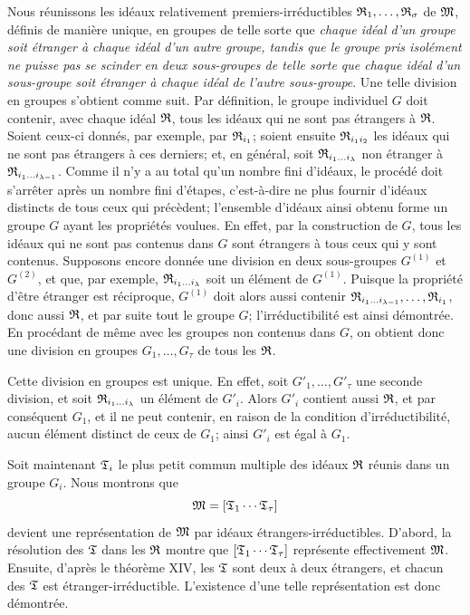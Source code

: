 Nous réunissons les idéaux relativement premiers-irréductibles $\mathfrak{R}_1,\ldots,\mathfrak{R}_\sigma$ de $\mathfrak{M}$, définis de manière unique, en groupes de telle sorte que \emph{chaque idéal d'un groupe soit étranger à chaque idéal d'un autre groupe, tandis que le groupe pris isolément ne puisse pas se scinder en deux sous-groupes de telle sorte que chaque idéal d'un sous-groupe soit étranger à chaque idéal de l'autre sous-groupe}. Une telle division en groupes s'obtient comme suit. Par définition, le groupe individuel $G$ doit contenir, avec chaque idéal $\mathfrak{R}$, tous les idéaux qui ne sont pas étrangers à $\mathfrak{R}$. Soient ceux-ci donnés, par exemple, par $\mathfrak{R}_{i_1}$; soient ensuite $\mathfrak{R}_{i_1i_2}$ les idéaux qui ne sont pas étrangers à ces derniers; et, en général, soit $\mathfrak{R}_{i_1\ldots i_\lambda}$ non étranger à $\mathfrak{R}_{i_1\ldots i_{\lambda-1}}$. Comme il n'y a au total qu'un nombre fini d'idéaux, le procédé doit s'arrêter après un nombre fini d'étapes, c'est-à-dire ne plus fournir d'idéaux distincts de tous ceux qui précèdent; l'ensemble d'idéaux ainsi obtenu forme un groupe $G$ ayant les propriétés voulues. En effet, par la construction de $G$, tous les idéaux qui ne sont pas contenus dans $G$ sont étrangers à tous ceux qui y sont contenus. Supposons encore donnée une division en deux sous-groupes $G^{(1)}$ et $G^{(2)}$, et que, par exemple, $\mathfrak{R}_{i_1\ldots i_\lambda}$ soit un élément de $G^{(1)}$. Puisque la propriété d'être étranger est réciproque, $G^{(1)}$ doit alors aussi contenir $\mathfrak{R}_{i_1\ldots i_{\lambda-1}},\ldots,\mathfrak{R}_{i_1}$, donc aussi $\mathfrak{R}$, et par suite tout le groupe $G$; l'irréductibilité est ainsi démontrée. En procédant de même avec les groupes non contenus dans $G$, on obtient donc une division en groupes $G_1,\ldots,G_\tau$ de tous les $\mathfrak{R}$.

Cette division en groupes est unique. En effet, soit $G'_1,\ldots,G'_\tau$ une seconde division, et soit $\mathfrak{R}_{i_1\ldots i_\lambda}$ un élément de $G'_i$. Alors $G'_i$ contient aussi $\mathfrak{R}$, et par conséquent $G_1$, et il ne peut contenir, en raison de la condition d'irréductibilité, aucun élément distinct de ceux de $G_1$; ainsi $G'_i$ est égal à $G_1$.

Soit maintenant $\mathfrak{T}_i$ le plus petit commun multiple des idéaux $\mathfrak{R}$ réunis dans un groupe $G_i$. Nous montrons que
\[
 \mathfrak{M}=[\mathfrak{T}_1\cdots\mathfrak{T}_\tau]
\]
devient une représentation de $\mathfrak{M}$ par idéaux étrangers-irréductibles. D'abord, la résolution des $\mathfrak{T}$ dans les $\mathfrak{R}$ montre que $[\mathfrak{T}_1\cdots\mathfrak{T}_\tau]$ représente effectivement $\mathfrak{M}$. Ensuite, d'après le théorème XIV, les $\mathfrak{T}$ sont deux à deux étrangers, et chacun des $\mathfrak{T}$ est étranger-irréductible. L'existence d'une telle représentation est donc démontrée.

